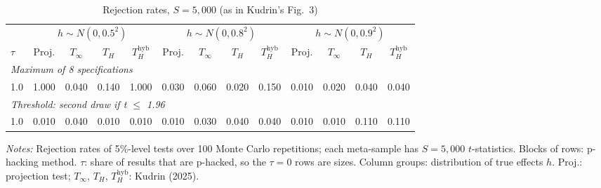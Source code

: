\begin{table}[htbp]
\centering
\caption{Rejection rates, $S = 5{,}000$ (as in Kudrin's Fig.~3)}
\label{tab:kudrin_style_var_dial_S5000}
\footnotesize
\setlength{\tabcolsep}{4pt}
\begin{tabular}{lcccccccccccc}
\toprule
 & \multicolumn{4}{c}{$h \sim N(0, 0.5^2)$} & \multicolumn{4}{c}{$h \sim N(0, 0.8^2)$} & \multicolumn{4}{c}{$h \sim N(0, 0.9^2)$} \\
\cmidrule(lr){2-5} \cmidrule(lr){6-9} \cmidrule(lr){10-13}
$\tau$ & Proj. & $T_\infty$ & $T_H$ & $T_H^{\mathrm{hyb}}$ & Proj. & $T_\infty$ & $T_H$ & $T_H^{\mathrm{hyb}}$ & Proj. & $T_\infty$ & $T_H$ & $T_H^{\mathrm{hyb}}$ \\
\midrule
\multicolumn{13}{l}{\textit{Maximum of 8 specifications}} \\
1.0 & 1.000 & 0.040 & 0.140 & 1.000 & 0.030 & 0.060 & 0.020 & 0.150 & 0.010 & 0.020 & 0.040 & 0.040 \\
\midrule
\multicolumn{13}{l}{\textit{Threshold: second draw if t $\le$ 1.96}} \\
1.0 & 0.010 & 0.040 & 0.010 & 0.010 & 0.010 & 0.030 & 0.040 & 0.040 & 0.010 & 0.010 & 0.110 & 0.110 \\
\bottomrule
\end{tabular}
\par\smallskip
\begin{minipage}{\linewidth}\footnotesize\textit{Notes:} Rejection rates of 5\%-level tests over 100 Monte Carlo repetitions; each meta-sample has $S = 5{,}000$ $t$-statistics. Blocks of rows: p-hacking method. $\tau$: share of results that are p-hacked, so the $\tau = 0$ rows are sizes. Column groups: distribution of true effects $h$. Proj.: projection test; $T_\infty$, $T_H$, $T_H^{\mathrm{hyb}}$: Kudrin (2025).\end{minipage}
\end{table}
